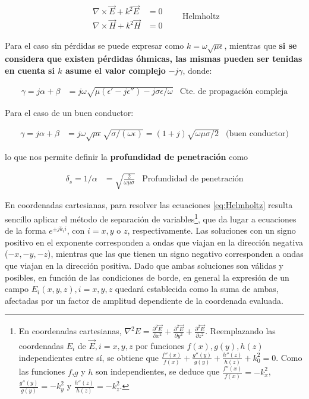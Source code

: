 \begin{equation}
	\label{eq:Helmholtz}
	\begin{aligned}
		\nabla \times \vec{E} + k^2 \vec{E} &= 0  \\
		\nabla \times \vec{H} + k^2 \vec{H}& = 0 
	\end{aligned}
	\qquad \text{Helmholtz}
\end{equation}

Para el caso sin pérdidas se puede expresar como $k = \omega \sqrt{\mu \epsilon}$, mientras que \textbf{si se considera que existen pérdidas óhmicas, las mismas pueden ser tenidas en cuenta si $k$ asume el valor complejo} $-j\gamma$, donde:

\begin{align}
\label{eq:constante-propagacion-compleja}
\gamma = j\alpha + \beta &= j\omega \sqrt{\mu (\epsilon'-j\epsilon'') - j \sigma \epsilon/\omega} & \text{Cte. de propagación compleja}
\end{align}

Para el caso de un buen conductor:

\begin{align}
\gamma = j\alpha + \beta &= j \omega \sqrt{\mu \epsilon} \sqrt{\sigma/(\omega \epsilon)} = (1+j) \sqrt{\omega \mu \sigma/2} & \text{(buen conductor)}
\end{align}

lo que nos permite definir la \textbf{profundidad de penetración} como 

\begin{align}
\delta_s = 1/\alpha &= \sqrt{\frac{2}{\omega \mu \sigma}} & \text{Profundidad de penetración}
\end{align}

En coordenadas cartesianas, para resolver las ecuaciones \ref{eq:Helmholtz} resulta sencillo aplicar el método de separación de variables\footnote{En coordenadas cartesianas, $\nabla^2 E = \frac{\partial^2 \vec{E}}{\partial x^2} + \frac{\partial^2 \vec{E}}{\partial y^2} + \frac{\partial^2 \vec{E}}{\partial z^2}$. Reemplazando las coordenadas $E_i$ de $\vec{E}, i=x,y,z$ por funciones $f(x),g(y),h(z)$ independientes entre sí, se obtiene que $\frac{f''(x)}{f(x)} + \frac{g''(y)}{g(y)} + \frac{h''(z)}{h(z)} + k_0^2 = 0$. Como las funciones $f$,$g$ y $h$ son independientes, se deduce que $\frac{f''(x)}{f(x)} = -k_x^2$, $\frac{g''(y)}{g(y)} = -k_y^2$ y $\frac{h''(z)}{h(z)} = -k_z^2$.}, que da lugar a ecuaciones de la forma $e^{\pm j k_i i}$, con $i = x, y$ o $z$, respectivamente. Las soluciones con un signo positivo en el exponente corresponden a ondas que viajan en la dirección negativa ($-x, -y, -z$), mientras que las que tienen un signo negativo corresponden a ondas que viajan en la dirección positiva. Dado que ambas soluciones son válidas y posibles, en función de las condiciones de borde, en general la expresión de un campo $E_i (x, y, z), i=x,y,z$ quedará establecida como la suma de ambas, afectadas por un factor de amplitud dependiente de la coordenada evaluada.

